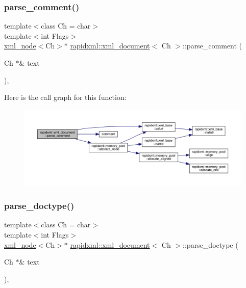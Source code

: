 \subsubsection{\texorpdfstring{parse\_comment()}{parse\_comment()}}
{\footnotesize\ttfamily template$<$class Ch = char$>$ \\
template$<$int Flags$>$ \\
\mbox{\hyperlink{classrapidxml_1_1xml__node}{xml\+\_\+node}}$<$Ch$>$$\ast$ \mbox{\hyperlink{classrapidxml_1_1xml__document}{rapidxml\+::xml\+\_\+document}}$<$ Ch $>$\+::parse\+\_\+comment (\begin{DoxyParamCaption}\item[{Ch $\ast$\&}]{text }\end{DoxyParamCaption})\hspace{0.3cm}{\ttfamily [inline]}, {\ttfamily [private]}}

Here is the call graph for this function\+:
\nopagebreak
\begin{figure}[H]
\begin{center}
\leavevmode
\includegraphics[width=350pt]{classrapidxml_1_1xml__document_abc287ce83bcb2dc8519e300236004591_cgraph}
\end{center}
\end{figure}
\mbox{\label{classrapidxml_1_1xml__document_a4c613f3a928f763b4c788422edda5860}} 
\subsubsection{\texorpdfstring{parse\_doctype()}{parse\_doctype()}}
{\footnotesize\ttfamily template$<$class Ch = char$>$ \\
template$<$int Flags$>$ \\
\mbox{\hyperlink{classrapidxml_1_1xml__node}{xml\+\_\+node}}$<$Ch$>$$\ast$ \mbox{\hyperlink{classrapidxml_1_1xml__document}{rapidxml\+::xml\+\_\+document}}$<$ Ch $>$\+::parse\+\_\+doctype (\begin{DoxyParamCaption}\item[{Ch $\ast$\&}]{text }\end{DoxyParamCaption})\hspace{0.3cm}{\ttfamily [inline]}, {\ttfamily [private]}}

